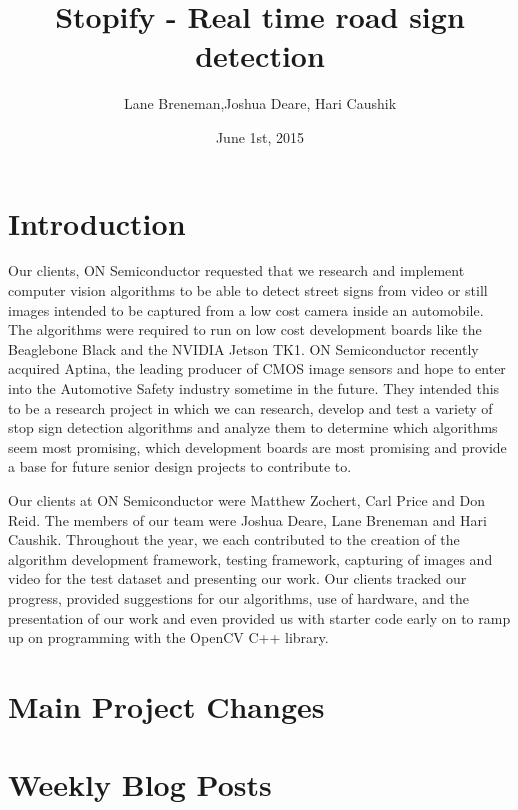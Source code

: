\documentclass[letterpaper,10pt,titlepage]{article}
\title{Stopify - Real time road sign detection}
\date{June 1st, 2015}
\author{Lane Breneman,Joshua Deare, Hari Caushik}
\begin{document}
\maketitle

\section*{Introduction}
Our clients, ON Semiconductor requested that we research and implement computer
vision algorithms to be able to detect street signs from video or still images
intended to be captured from a low cost camera inside an automobile. The 
algorithms were required to run on low cost development boards like the 
Beaglebone Black and the NVIDIA Jetson TK1. ON Semiconductor recently acquired
Aptina, the leading producer of CMOS image sensors and hope to enter into the
Automotive Safety industry sometime in the future. They intended this to be a 
research project in which we can research, develop and test a variety of stop 
sign detection algorithms and analyze them to determine which algorithms seem
most promising, which development boards are most promising and provide a base 
for future senior design projects to contribute to.

Our clients at ON Semiconductor were Matthew Zochert, Carl Price and Don Reid.
The members of our team were Joshua Deare, Lane Breneman and Hari Caushik. 
Throughout the year, we each contributed to the creation of the algorithm 
development framework, testing framework, capturing of images and video for 
the test dataset and presenting our work. Our clients tracked our progress,
provided suggestions for our algorithms, use of hardware, and the presentation
of our work and even provided us with starter code early on to ramp up on 
programming with the OpenCV C++ library. 

\section*{Main Project Changes}

\section*{Weekly Blog Posts}
\end{document}
